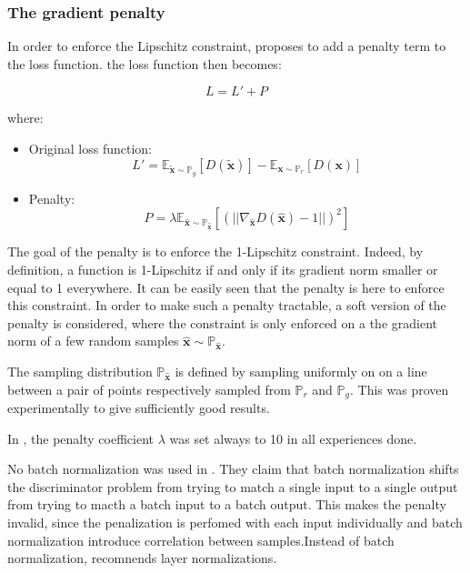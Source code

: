 \documentclass{article}
\begin{document}
\subsubsection{The gradient penalty}

In order to enforce the Lipschitz constraint, \cite{DBLP:journals/corr/GulrajaniAADC17} proposes to add a penalty term to the loss function. the loss function then becomes: 

\begin{equation}
    L = L' + P
\end{equation}

where:

\begin{itemize}
    \item Original loss function: 
    \begin{equation}
        L' = \mathbb{E}_{\mathbf{\tilde{x}} \sim \mathbb{P}_g} [D(\mathbf{\tilde{x}})] - \mathbb{E}_{\mathbf{x} \sim \mathbb{P}_r} [D(\mathbf{x})]
    \end{equation}
    \item Penalty:
    \begin{equation}
        P = \lambda \mathbb{E}_{\hat{\mathbf{x}} \sim \mathbb{P}_{\hat{\mathbf{x}}}}[(||\nabla_{\hat{\mathbf{x}}} D(\hat{\mathbf{x}})-1||)^2]
    \end{equation}
\end{itemize}

The goal of the penalty is to enforce the 1-Lipschitz constraint. Indeed, by definition, a function is 1-Lipschitz if and only if its gradient norm smaller or equal to 1 everywhere. It can be easily seen that the penalty is here to enforce this constraint. In order to make such a penalty tractable, a soft version of the penalty is considered, where the constraint is only enforced on a the gradient norm of a few random samples $\hat{\mathbf{x}} \sim \mathbb{P}_{\hat{\mathbf{x}}}$.

The sampling distribution $\mathbb{P}_{\hat{\mathbf{x}}}$ is defined by sampling uniformly on on a line between a pair of points respectively sampled from $\mathbb{P}_{r}$ and $\mathbb{P}_{g}$. This was proven experimentally to give sufficiently good results.

In \cite{DBLP:journals/corr/GulrajaniAADC17}, the penalty coefficient $\lambda$ was set always to 10 in all experiences done.

No batch normalization was used in \cite{DBLP:journals/corr/GulrajaniAADC17}. They claim that batch normalization shifts the discriminator problem from trying to match a single input to a single output from trying to macth a batch input to a batch output. This makes the penalty invalid, since the penalization is perfomed with each input individually and batch normalization introduce correlation between samples.Instead of batch normalization, \cite{DBLP:journals/corr/GulrajaniAADC17} recomnends layer normalizations.

%

 
\end{document}
